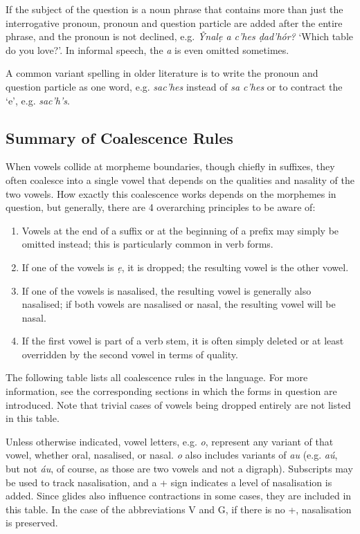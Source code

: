 \documentclass[a4paper, 12pt, twoside, final]{article}
\let \w \textit
\begin{document}
If the subject of the question is a noun phrase that contains more than just the interrogative pronoun,
pronoun and question particle are added after the entire phrase, and the pronoun is not declined, e.g.
\w{Ŷnalẹ a c’hes ḍad’hór?} ‘Which table do you love?’. In informal speech, the \w{a} is even omitted
sometimes.

A common variant spelling in older literature is to write the pronoun and question particle as one
word, e.g. \w{sac’hes} instead of \w{sa c’hes} or to contract the ‘e’, e.g. \w{sac’h’s}.


\subsection{Summary of Coalescence Rules}
When vowels collide at morpheme boundaries, though chiefly in suffixes, they often coalesce into a
single vowel that depends on the qualities and nasality of the two vowels. How exactly this coalescence
works depends on the morphemes in question, but generally, there are 4 overarching principles to be
aware of:
\begin{enumerate}
\item Vowels at the end of a suffix or at the beginning of a prefix may simply be omitted instead;
      this is particularly common in verb forms.
\item If one of the vowels is \w{ẹ}, it is dropped; the resulting vowel is the other vowel.
\item If one of the vowels is nasalised, the resulting vowel is generally also nasalised; if both
      vowels are nasalised or nasal, the resulting vowel will be nasal.
\item If the first vowel is part of a verb stem, it is often simply deleted or at least overridden
      by the second vowel in terms of quality.
\end{enumerate}

\noindent The following table lists all coalescence rules in the language. For more information, see the corresponding
sections in which the forms in question are introduced. Note that trivial cases of vowels being dropped entirely
are not listed in this table.

Unless otherwise indicated, vowel letters, e.g. \w{o}, represent any variant of that vowel, whether oral, nasalised, or nasal.
\w{o} also includes variants of \w{au} (e.g. \w{aú}, but not \w{áu}, of course, as those are two vowels and not a digraph).
Subscripts may be used to track nasalisation, and a + sign indicates a level of nasalisation is added. Since glides also
influence contractions in some cases, they are included in this table. In the case of the abbreviations V and G, if there
is no +, nasalisation is preserved.
\end{document}
